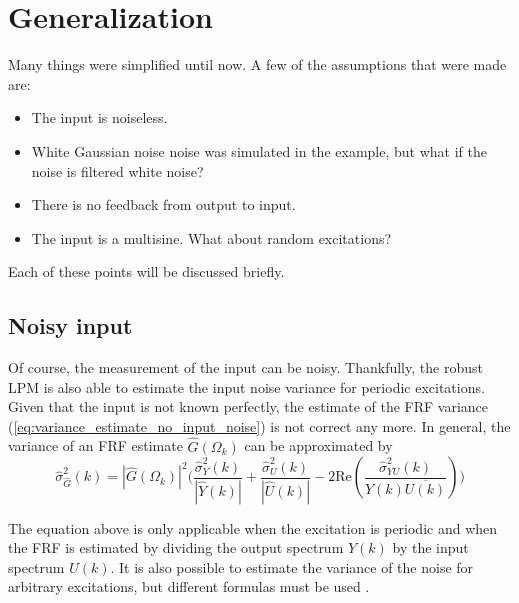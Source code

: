 \section{Generalization}
Many things were simplified until now. A few of the assumptions that were made are:
\begin{itemize}
    \item The input is noiseless.
    \item White Gaussian noise noise was simulated in the example, but what if the noise is filtered white noise?
    \item There is no feedback from output to input.
    \item The input is a multisine. What about random excitations?
\end{itemize}
Each of these points will be discussed briefly.

\subsection{Noisy input}
Of course, the measurement of the input can be noisy. Thankfully, the robust LPM is also able to estimate the input noise variance for periodic excitations. Given that the input is not known perfectly, the estimate of the FRF variance (\ref{eq:variance_estimate_no_input_noise}) is not correct any more. In general, the variance of an FRF estimate $\hat G(\Omega_k)$ can be approximated by
\begin{equation*}
    \hat \sigma_{\hat G}^2(k) = |\hat G(\Omega_k)|^2 \Bigg(\frac{\hat{\sigma}_{Y}^2(k)}{|\hat{Y}(k)|} + \frac{\hat{\sigma}_{U}^2(k)}{|\hat{U}(k)|}
-2\mathrm{Re}\left(\frac{\hat{\sigma}^2_{YU}(k)}{Y(k)\overline{U(k)}}\right) \Bigg)
\end{equation*}

The equation above is only applicable when the excitation is periodic and when the FRF is estimated by dividing the output spectrum $Y(k)$ by the input spectrum $U(k)$. It is also possible to estimate the variance of the noise for arbitrary excitations, but different formulas must be used \cite[Section 2.6]{pintelon_book}.

